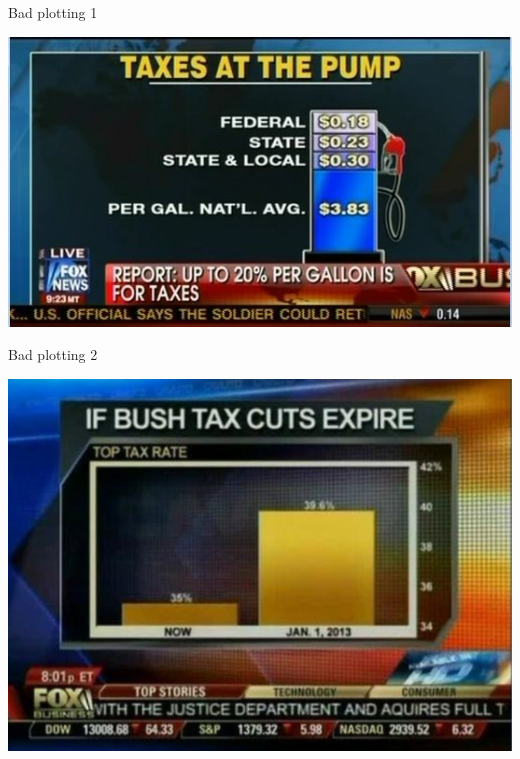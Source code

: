 \documentclass[
  ignorenonframetext,
]{beamer}
\begin{document}
\begin{frame}{Bad plotting 1}
\protect\hypertarget{bad-plotting-1}{}

\includegraphics{fig/bad_scale_axis.jpg}

\end{frame}

\begin{frame}{Bad plotting 2}
\protect\hypertarget{bad-plotting-2}{}

\includegraphics{fig/bar_comparison.png}

\end{frame}
\end{document}
